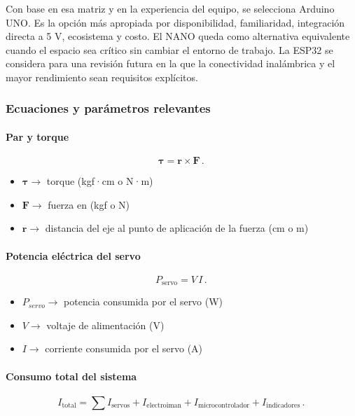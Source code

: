 Con base en esa matriz y en la experiencia del equipo, se selecciona Arduino UNO. Es la opción más apropiada por disponibilidad, familiaridad, integración directa a 5 V, ecosistema y costo. El NANO queda como alternativa equivalente cuando el espacio sea crítico sin cambiar el entorno de trabajo. La ESP32 se considera para una revisión futura en la que la conectividad inalámbrica y el mayor rendimiento sean requisitos explícitos.

\subsubsection{Ecuaciones y parámetros relevantes}


\paragraph{Par y torque}
\begin{equation}
  \boldsymbol{\tau} = \boldsymbol{r} \times \boldsymbol{F} \,.\,
\end{equation}

\begin{itemize}
  \item $\bm{\tau} \rightarrow$ torque (kgf·cm o N·m)
  \item $\bm{F} \rightarrow$ fuerza en (kgf o N)
  \item $\bm{r} \rightarrow$ distancia del eje al punto de aplicación de la fuerza  (cm o m)
\end{itemize}

\cite{libretexts_torque_2023}


\paragraph{Potencia eléctrica del servo}
\begin{equation}
  P_{\mathrm{servo}} = V\,I \,.\,
\end{equation}

\begin{itemize}
  \item $P_{{servo}} \rightarrow$ potencia consumida por el servo (W)
  \item $V \rightarrow$ voltaje de alimentación (V)
  \item $I \rightarrow$ corriente consumida por el servo (A)
\end{itemize}

\cite{openstax_power_2020}

\paragraph{Consumo total del sistema}
\begin{equation}
  I_{\mathrm{total}} = \sum I_{\mathrm{servos}} + I_{\mathrm{electroiman}} + I_{\mathrm{microcontrolador}} + I_{\mathrm{indicadores}} \,.\,
\end{equation}

